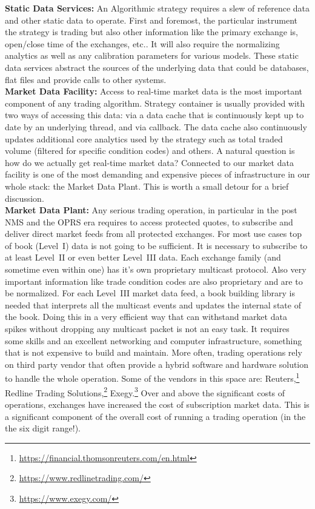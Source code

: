 \noindent\textbf{Static Data Services:} An Algorithmic strategy requires a slew of reference data and other static data to operate. First and foremost, the particular instrument the strategy is trading but also other information like the primary exchange is, open/close time of the exchanges, etc.. It will also require the normalizing analytics as well as any calibration parameters for various models. These static data services abstract the sources of the underlying data that could be databases, flat files and provide calls to other systems. \\


\noindent\textbf{Market Data Facility:} Access to real-time market data is the most important component of any trading algorithm. Strategy container is usually provided with two ways of accessing this data: via a data cache that is continuously kept up to date by an underlying thread, and via callback. The data cache also continuously updates additional core analytics used by the strategy such as total traded volume (filtered for specific condition codes) and others. A natural question is how do we actually get real-time market data? Connected to our market data facility is one of the most demanding and expensive pieces of infrastructure in our whole stack: the Market Data Plant. This is worth a small detour for a brief discussion. \\


\noindent\textbf{Market Data Plant:}  Any serious trading operation, in particular in the post NMS and the OPRS era requires to access protected quotes, to subscribe and deliver direct market feeds from all protected exchanges. For most use cases top of book (Level~I) data is not going to be sufficient. It is necessary to subscribe to at least Level~II or even better Level~III data. Each exchange family (and sometime even within one) has it's own proprietary multicast protocol. Also very important information like trade condition codes are also proprietary and are to be normalized. For each Level~III market data feed, a book building library is needed that interprets all the multicast events and updates the internal state of the book. Doing this in a very efficient way that can withstand market data spikes without dropping any multicast packet is not an easy task. It requires some skills and an excellent networking and computer infrastructure, something that is not expensive to build and maintain. More often, trading operations rely on third party vendor that often provide a hybrid software and hardware solution to handle the whole operation. Some of the vendors in this space are: Reuters,\footnote{\url{https://financial.thomsonreuters.com/en.html}} Redline Trading Solutions,\footnote{\url{https://www.redlinetrading.com/}} Exegy.\footnote{\url{https://www.exegy.com/}} Over and above the significant costs of operations, exchanges have increased the cost of subscription market data. This is a significant component of the overall cost of running a trading operation (in the the six digit range!). \\


